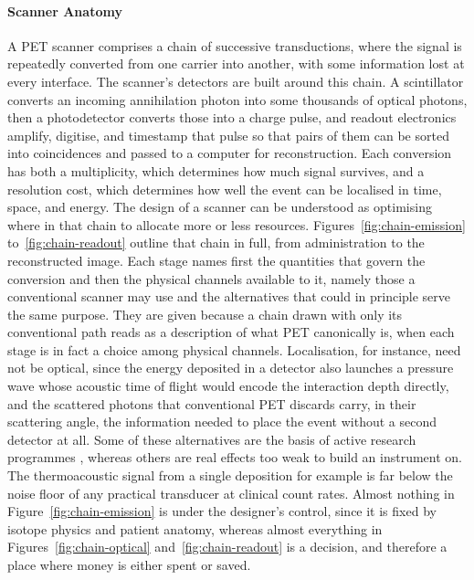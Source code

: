 \paragraph{Scanner Anatomy}
A PET scanner comprises a chain of successive transductions, where the signal is repeatedly converted from one carrier into another, with some information lost at every interface.
The scanner's detectors are built around this chain. A scintillator converts an incoming annihilation photon into some thousands of optical photons, then a photodetector converts those into a charge pulse, and readout electronics amplify, digitise, and timestamp that pulse so that pairs of them can be sorted into coincidences and passed to a computer for reconstruction.
Each conversion has both a multiplicity, which determines how much signal survives, and a resolution cost, which determines how well the event can be localised in time, space, and energy.
The design of a scanner can be understood as optimising where in that chain to allocate more or less resources.
Figures~\ref{fig:chain-emission} to~\ref{fig:chain-readout} outline that chain in full, from administration to the reconstructed image.
Each stage names first the quantities that govern the conversion and then the physical channels available to it, namely those a conventional scanner may use and the alternatives that could in principle serve the same purpose.
They are given because a chain drawn with only its conventional path reads as a description of what PET canonically is, when each stage is in fact a choice among physical channels. Localisation, for instance, need not be optical, since the energy deposited in a detector also launches a pressure wave whose acoustic time of flight would encode the interaction depth directly, and the scattered photons that conventional PET discards carry, in their scattering angle, the information needed to place the event without a second detector at all.
Some of these alternatives are the basis of active research programmes , whereas others are real effects too weak to build an instrument on. The thermoacoustic signal from a single  deposition for example is far below the noise floor of any practical transducer at clinical count rates.
Almost nothing in Figure~\ref{fig:chain-emission} is under the designer's control, since it is fixed by isotope physics and patient anatomy, whereas almost everything in Figures~\ref{fig:chain-optical} and~\ref{fig:chain-readout} is a decision, and therefore a place where money is either spent or saved.

